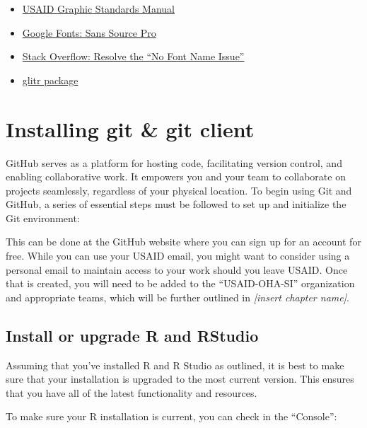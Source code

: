\documentclass[
  letterpaper,
  DIV=11,
  numbers=noendperiod]{scrreprt}
\providecommand{\tightlist}{%
  \setlength{\itemsep}{0pt}\setlength{\parskip}{0pt}}\usepackage{longtable,booktabs,array}
\begin{document}
\begin{itemize}
\tightlist
\item
  \href{https://www.usaid.gov/branding/gsm}{USAID Graphic Standards
  Manual}
\item
  \href{https://fonts.google.com/specimen/Source+Sans+Pro}{Google Fonts:
  Sans Source Pro}
\item
  \href{https://stackoverflow.com/questions/61204259/how-can-i-resolve-the-no-font-name-issue-when-importing-fonts-into-r-using-ext/68642855\#68642855}{Stack
  Overflow: Resolve the ``No Font Name Issue''}
\item
  \href{https://usaid-oha-si.github.io/glitr/}{glitr package}
\end{itemize}

\hypertarget{installing-git-git-client}{%
\chapter{Installing git \& git client}\label{installing-git-git-client}}

GitHub serves as a platform for hosting code, facilitating version
control, and enabling collaborative work. It empowers you and your team
to collaborate on projects seamlessly, regardless of your physical
location. To begin using Git and GitHub, a series of essential steps
must be followed to set up and initialize the Git environment:

This can be done at the GitHub website where you can sign up for an
account for free. While you can use your USAID email, you might want to
consider using a personal email to maintain access to your work should
you leave USAID. Once that is created, you will need to be added to the
``USAID-OHA-SI'' organization and appropriate teams, which will be
further outlined in \emph{{[}insert chapter name{]}}.

\hypertarget{install-or-upgrade-r-and-rstudio}{%
\section{Install or upgrade R and
RStudio}\label{install-or-upgrade-r-and-rstudio}}

Assuming that you've installed R and R Studio as outlined, it is best to
make sure that your installation is upgraded to the most current
version. This ensures that you have all of the latest functionality and
resources.

To make sure your R installation is current, you can check in the
``Console'':
\end{document}
